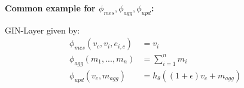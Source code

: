 \textbf{Common example for $\phi_{mes},\phi_{agg},\phi_{upd}$:}\par
\noindent GIN-Layer \cite{paperGIN} given by:
\begin{align*}
    \phi_{mes}(v_c, v_i, e_{i,c})&=v_i\\
    \phi_{agg}(m_1,...,m_n)&=\sum_{i=1}^{n}m_i\\
    \phi_{upd}(v_c,m_{agg})&=h_\theta\left((1+\epsilon)v_c+m_{agg}\right)
\end{align*}